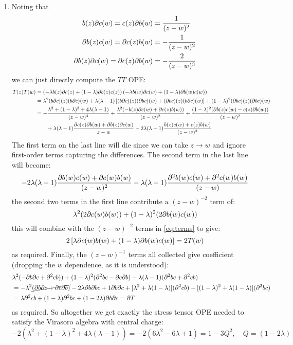 \documentclass[11pt]{article}
\begin{document}
\begin{enumerate}
	
	
	\item Noting that
	\[
	\begin{aligned}
		b(z) \partial c(w) = c(z) \partial b(w) &= \frac{1}{(z-w)^2}\\
		\partial b(z) c(w) = \partial c(z) b(w) &= - \frac{1}{(z-w)^2}\\ 
		\partial b(z) \partial c(w) = \partial c(z) \partial b(w) &= -\frac{2}{(z-w)^3}
	\end{aligned}
	\]
	we can just directly compute the $TT$ OPE:
	\[
	\begin{aligned}
		T(z) T(w) &= \left(-\lambda b(z) \partial c(z) + (1-\lambda) \partial b(z) c(z) \right) \left(-\lambda b(w) \partial c(w) + (1-\lambda) \partial b(w) c(w) \right)\\
		&= \lambda^2 (b \partial c)(z) (b \partial c)(w) + \lambda (\lambda - 1)\left[ (b \partial c)(z) (\partial b c)(w) + (\partial b c) (z) (b \partial c)(w)\right] + (1-\lambda)^2 (\partial b c)(z) (\partial b c)(w)\\
		&= - \frac{\lambda^2 + (1-\lambda)^2 + 4 \lambda (\lambda-1) }{(z-w)^4} + \frac{\lambda^2 (-b(z) \partial c(w) + \partial c(z) b(w))}{(z-w)^2} + \frac{(1-\lambda)^2 (\partial b(z) c(w) - c(z) \partial b(w))}{(z-w)^2}\\
		&\qquad + \lambda (\lambda-1) \frac{\partial c(z) \partial b(w) + \partial b(z) \partial c(w)}{z-w} - 2 \lambda (\lambda-1) \frac{b(z) c(w) + c(z) b(w)}{(z-w)^3}
	\end{aligned}
	\]
	The first term on the last line will die since we can take $z \to w$ and ignore first-order terms capturing the differences. The second term in the last line will become:
	\begin{equation}\label{eq:terms}
		- 2 \lambda (\lambda - 1) \frac{\partial b(w) c(w) + \partial c(w) b(w)}{(z-w)^2} - \lambda (\lambda - 1) \frac{\partial^2 b(w) c(w) + \partial^2 c(w) b(w)}{(z-w)}
	\end{equation}
	the second two terms in the first line contribute a $(z-w)^{-2}$ term of:
	\[
		\lambda^2 (2 \partial c(w) b(w)) + (1-\lambda)^2 (2 \partial b(w) c(w))
	\]
	this will combine with the $(z-w)^{-2}$ terms in \eqref{eq:terms} to give:
	\[
		2 \left[ \lambda \partial c(w) b(w) + (1 - \lambda) \partial b(w) c(w) \right] = 2 T(w)
	\]
	as required. Finally, the $(z-w)^{-1}$ terms all collected give coefficient (dropping the $w$ dependence, as it is understood):
	\[
	\begin{aligned}
		& \lambda^2 (-\partial b \partial c + \partial^2 c b)) + (1-\lambda)^2 (\partial^2 b c - \partial c \partial b) - \lambda (\lambda - 1) (\partial^2 b c + \partial^2 c b)\\
		&= - \lambda^2 \cancel{(\partial b \partial c + \partial c \partial b)} - 2 \lambda \partial b \partial bc + 1 \partial b \partial c  + [\lambda^2 + \lambda (1 -\lambda)] (\partial^2 c b) + [(1-\lambda)^2 + \lambda (1-\lambda)] (\partial^2 b c)\\
		&= \lambda \partial^2 c b + (1-\lambda) \partial^2 b c + (1 - 2 \lambda) \partial b \partial c = \partial T
	\end{aligned}
	\]
	as required. So altogether we get exactly the stress tensor OPE needed to satisfy the Virasoro algebra with central charge:
	\[
		-2 (\lambda^2 + (1-\lambda)^2 + 4 \lambda(\lambda-1)) = - 2 (6 \lambda^2 - 6 \lambda + 1) = 1 - 3 Q^2, \quad Q = (1-2\lambda)
	\]
	

\end{enumerate}
\end{document}
